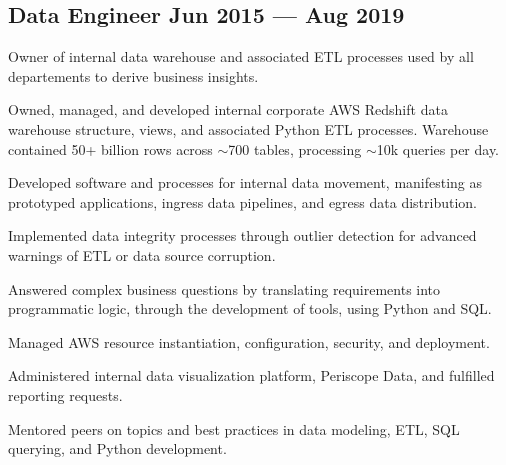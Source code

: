 \documentclass[letter,10pt]{article}
\begin{document}
\subsection{{Data Engineer \hfill Jun 2015 --- Aug 2019}}

\vspace{10pt}

Owner of internal data warehouse and associated ETL processes used by all departements to derive business insights.


\vspace{10pt}

\begin{zitemize}
    \item Owned, managed, and developed internal corporate AWS Redshift data warehouse structure, views, and associated Python ETL processes. Warehouse contained 50+ billion rows across $\sim$700 tables, processing $\sim$10k queries per day.
    \item Developed software and processes for internal data movement, manifesting as prototyped applications, ingress data pipelines, and egress data distribution.
    \item Implemented data integrity processes through outlier detection for advanced warnings of ETL or data source corruption.
    \item Answered complex business questions by translating requirements into programmatic logic, through the development of tools, using Python and SQL.
    \item Managed AWS resource instantiation, configuration, security, and deployment.
    \item Administered internal data visualization platform, Periscope Data, and fulfilled reporting requests.
    \item Mentored peers on topics and best practices in data modeling, ETL, SQL querying, and Python development.
\end{zitemize}

\vspace{5pt}
\end{document}
